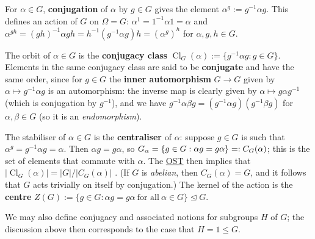 \begin{example}[conjugation]\label{eg:conjugation}
    For $\alpha \in G$, \textbf{conjugation} of $\alpha$ by $g \in G$ gives the element $\alpha^g := g^{-1}\alpha g$. This defines an action of $G$ on $\Omega = G$: $\alpha^1 = 1^{-1}\alpha 1 = \alpha$ and $\alpha^{gh} = (gh)^{-1}\alpha gh = h^{-1}(g^{-1}\alpha g)h = (\alpha^g)^h$ for $\alpha,g,h \in G$.

    The orbit of $\alpha \in G$ is the \textbf{conjugacy class} $\operatorname{Cl}_G(\alpha) := \{g^{-1}\alpha g : g \in G\}$. Elements in the same conjugacy class are said to be \textbf{conjugate} and have the same order, since for $g \in G$ the \textbf{inner automorphism} $G \to G$ given by $\alpha \mapsto g^{-1}\alpha g$ is an automorphism: the inverse map is clearly given by $\alpha \mapsto g\alpha g^{-1}$ (which is conjugation by $g^{-1}$), and we have $g^{-1}\alpha\beta g = (g^{-1}\alpha g)(g^{-1} \beta g)$ for $\alpha,\beta \in G$ (so it is an \textit{endomorphism}). 

    The stabiliser of $\alpha \in G$ is the \textbf{centraliser} of $\alpha$: suppose $g \in G$ is such that $\alpha^g = g^{-1}\alpha g = \alpha$. Then $\alpha g = g \alpha$, so $\added{2}{G_\alpha} = \{g \in G : \alpha g = g \alpha\} =: C_G(\alpha)$; this is the set of elements that commute with $\alpha$. The \hyperref[thm:orbit_stabiliser]{OST} then implies that $|\operatorname{Cl}_G(\alpha)| = |G|/|C_G(\alpha)|$ . (If $G$ is \textit{abelian}, then $C_G(\alpha) = G$, and it follows that $G$ acts trivially on itself by conjugation.) The kernel of the action is the \textbf{centre} $Z(G) := \{g \in G : \alpha g = g \alpha\ \text{for all}\ \alpha \in G\} \trianglelefteq G$.
\end{example}

We may also define conjugacy and associated notions for subgroups $H$ of $G$; the discussion above then corresponds to the case that $H = 1 \leq G$.

